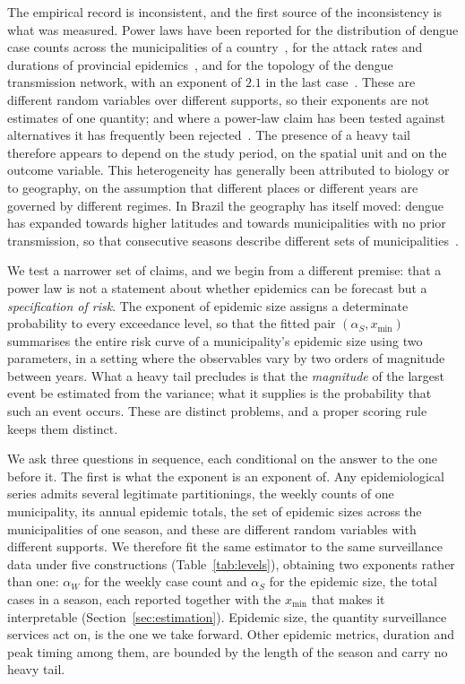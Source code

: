 \documentclass[english,10pt,b5paper]{article}
\begin{document}
The empirical record is inconsistent, and the first source of the
inconsistency is what was measured. Power laws have been reported for the
distribution of dengue case counts across the municipalities of a
country~\citep{antonio2017spatial}, for the attack rates and durations of
provincial epidemics~\citep{chowell2008spatial}, and for the topology of the
dengue transmission network, with an exponent of $2.1$ in the last
case~\citep{malik2019nature}. These are different random variables over
different supports, so their exponents are not estimates of one quantity; and
where a power-law claim has been tested against alternatives it has frequently
been rejected~\citep{clauset2009power, stumpf2012critical}. The presence of a
heavy tail therefore appears to depend on the study period, on the spatial
unit and on the outcome variable. This heterogeneity has generally been
attributed to biology or to geography, on the assumption that different places
or different years are governed by different regimes. In Brazil the geography
has itself moved: dengue has expanded towards higher latitudes and towards
municipalities with no prior transmission, so that consecutive seasons
describe different sets of municipalities~\citep{codeco2022expansion}.

We test a narrower set of claims, and we begin from a different premise: that
a power law is not a statement about whether epidemics can be forecast but a
\emph{specification of risk}. The exponent of epidemic size assigns a
determinate probability to every exceedance level, so that the fitted pair
$(\alpha_S, x_{\min})$ summarises the entire risk curve of a municipality's
epidemic size using two parameters, in a setting where the observables vary by
two orders of magnitude between years. What a heavy tail precludes is that the
\emph{magnitude} of the largest event be estimated from the variance; what it
supplies is the probability that such an event occurs. These are distinct
problems, and a proper scoring rule keeps them distinct.

We ask three questions in sequence, each conditional on the answer to the one
before it. The first is what the exponent is an exponent of. Any epidemiological
series admits several legitimate partitionings, the weekly counts of one
municipality, its annual epidemic totals, the set of epidemic sizes across the
municipalities of one season, and these are different random variables with
different supports. We therefore fit the same estimator to the same surveillance
data under five constructions (Table~\ref{tab:levels}), obtaining two exponents
rather than one: $\alpha_W$ for the weekly case count and $\alpha_S$ for the
epidemic size, the total cases in a season, each reported together with the
$x_{\min}$ that makes it interpretable (Section~\ref{sec:estimation}). Epidemic
size, the quantity surveillance services act on, is the one we take forward.
Other epidemic metrics, duration and peak timing among them, are bounded by the
length of the season and carry no heavy tail.
\end{document}
